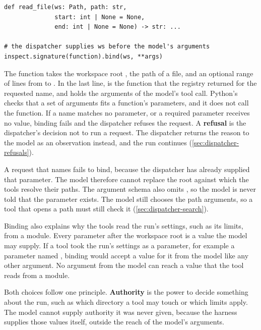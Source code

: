 \begin{lstlisting}[float=tbp, basicstyle=\ttfamily\footnotesize, caption={Illustrative code: the signature of \demoref{read\_file}, and the call with which the dispatcher binds the model's arguments to it.}, label=lst:dispatcher-bind]
def read_file(ws: Path, path: str,
              start: int | None = None,
              end: int | None = None) -> str: ...

# the dispatcher supplies ws before the model's arguments
inspect.signature(function).bind(ws, **args)
\end{lstlisting}

The function  takes the workspace root , the path of a file, and an
optional range of lines from  to . In the last line, 
is the function that the registry returned for the requested name, and  holds the
arguments of the model's tool call. Python's  checks that a set
of arguments fits a function's parameters, and it does not call the function. If a name matches no
parameter, or a required parameter receives no value, binding fails and the dispatcher refuses the
request. A \textbf{refusal} is the dispatcher's decision not to run a request. The dispatcher
returns the reason to the model as an observation instead, and the run continues
(\cref{sec:dispatcher-refusals}).

A request that names  fails to bind, because the dispatcher has already supplied that
parameter. The model therefore cannot replace the root against which the tools resolve their paths.
The argument schema also omits , so the model is never told that the parameter exists.
The model still chooses the path arguments, so a tool that opens a path must still check it
(\cref{sec:dispatcher-search}).

Binding also explains why the tools read the run's settings, such as its limits, from a module.
Every parameter after the workspace root is a value the model may supply. If a tool took the run's
settings as a parameter, for example a parameter named , binding would accept a
value for it from the model like any other argument. No argument from the model can reach a value
that the tool reads from a module.

Both choices follow one principle. \textbf{Authority} is the power to decide something about the
run, such as which directory a tool may touch or which limits apply. The model cannot supply
authority it was never given, because the harness supplies those values itself, outside the reach
of the model's arguments.

